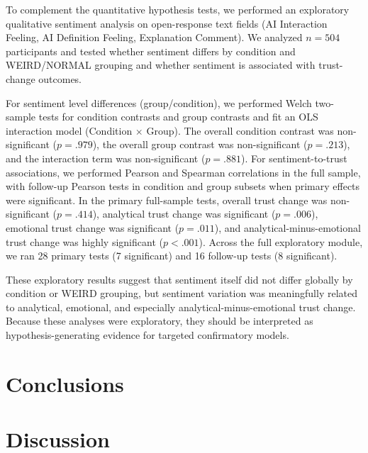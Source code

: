 \documentclass[a4paper,fleqn]{cas-sc}
\begin{document}
To complement the quantitative hypothesis tests, we performed an exploratory qualitative sentiment analysis on open-response text fields (AI Interaction Feeling, AI Definition Feeling, Explanation Comment). We analyzed $n=504$ participants and tested whether sentiment differs by condition and WEIRD/NORMAL grouping and whether sentiment is associated with trust-change outcomes.

For sentiment level differences (group/condition), we performed Welch two-sample tests for condition contrasts and group contrasts and fit an OLS interaction model (Condition $\times$ Group). The overall condition contrast was non-significant ($p = .979$), the overall group contrast was non-significant ($p = .213$), and the interaction term was non-significant ($p = .881$). For sentiment-to-trust associations, we performed Pearson and Spearman correlations in the full sample, with follow-up Pearson tests in condition and group subsets when primary effects were significant. In the primary full-sample tests, overall trust change was non-significant ($p = .414$), analytical trust change was significant ($p = .006$), emotional trust change was significant ($p = .011$), and analytical-minus-emotional trust change was highly significant ($p < .001$). Across the full exploratory module, we ran 28 primary tests (7 significant) and 16 follow-up tests (8 significant).

These exploratory results suggest that sentiment itself did not differ globally by condition or WEIRD grouping, but sentiment variation was meaningfully related to analytical, emotional, and especially analytical-minus-emotional trust change. Because these analyses were exploratory, they should be interpreted as hypothesis-generating evidence for targeted confirmatory models.


\section{Conclusions}

\section{Discussion}

\end{document}
